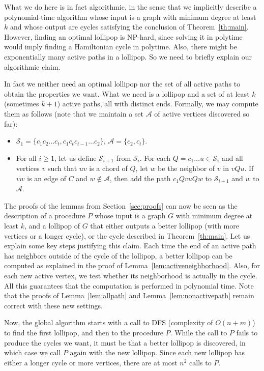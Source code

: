 \documentclass[11pt]{article}
\begin{document}
    
What we do here is in fact algorithmic, in the sense that we implicitly describe a polynomial-time algorithm whose input is a graph with minimum degree at least $k$ and whose output are cycles satisfying the conclusion of Theorem~\ref{th:main}.  However, finding an optimal lollipop is NP-hard, since solving it in polytime would imply finding a Hamiltonian cycle in polytime. Also, there might be exponentially many active paths in a lollipop. So we need to briefly explain our algorithmic claim. 

In fact we neither need an optimal lollipop nor the set of all active paths to obtain the properties we want. What we need is a lollipop and a set of at least $k$ (sometimes $k+1$) active paths, all with  distinct ends.  Formally, we may compute them as follows (note that we maintain a set $\mathcal A$ of active vertices discovered so far):

\begin{itemize}
    \item    
$\mathcal S_1 = \{c_1 c_2 \dots c_t, c_1c_t c_{t-1} \dots c_2\}$, $\mathcal A = \{c_2, c_t\}$.
\item 
For all $i\geq 1$, let us define $\mathcal S_{i+1}$ from $\mathcal S_{i}$. For each $Q = c_1\dots u \in \mathcal S_i$ and all vertices $v$ such that $uv$ is a chord of $Q$, let $w$ be the neighbor of $v$ in $vQu$. If $vw$ is an edge of $C$ and $w\notin \mathcal A$, then add the path $c_1QvuQw$ to $\mathcal S_{i+1}$ and $w$ to $\mathcal A$. 
\end{itemize}

The proofs of the lemmas from Section~\ref{sec:proofs} can now be seen as the description of a procedure $P$ whose input is a graph $G$ with minimum degree at least $k$, and a lollipop of $G$ that either outputs a better lollipop (with more vertices or a longer cycle), or the cycle described in Theorem~\ref{th:main}. Let us explain some key steps justifying this claim. Each time the end of an active path has neighbors outside of the cycle of the lollipop, a better lollipop can be computed as explained in the proof of Lemma~\ref{lem:activeneighborhood}. Also, for each new active vertex, we test whether its neighborhood is actually in the cycle. All this guarantees that the computation is performed in polynomial time. Note that the proofs of Lemma~\ref{lem:allpath} and Lemma~\ref{lem:nonactivepath} remain correct with these new settings. 

Now, the global algorithm starts with a call to DFS (complexity of $O(n+m)$) to find the first lollipop, and then to the procedure $P$. While the call to $P$ fails to produce the cycles we want, it must be that a better lollipop is discovered, in which case we call $P$ again with the new lollipop. Since each new lollipop has either a longer cycle or more vertices, there are at most $n^2$ calls to $P$. 
\end{document}
